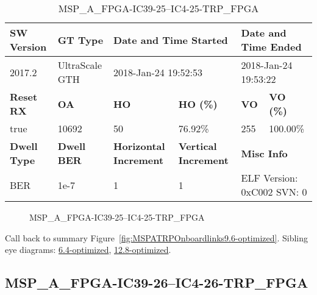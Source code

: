 \begin{table}[h]
\centering
\caption{MSP\_A\_FPGA-IC39-25--IC4-25-TRP\_FPGA}
\label{tab:MSPAFPGAIC3925IC425TRPFPGA9.6-optimized}
\begin{tabular}{@{}|l|l|l|l|l|l|@{}}
\toprule
\textbf{SW Version}                & \textbf{GT Type}   & \multicolumn{2}{l|}{\textbf{Date and Time Started}}            & \multicolumn{2}{l|}{\textbf{Date and Time Ended}}        \\ \midrule
2017.2                       & UltraScale GTH          & \multicolumn{2}{l|}{2018-Jan-24 19:52:53}                   & \multicolumn{2}{l|}{2018-Jan-24 19:53:22}               \\ \midrule
\textbf{Reset RX}                  & \textbf{OA} & \textbf{HO}   & \textbf{HO (\%)} & \textbf{VO} & \textbf{VO (\%)} \\ \midrule
true & 10692        & 50          & 76.92\%        & 255        & 100.00\%       \\ \midrule
\textbf{Dwell Type}                & \textbf{Dwell BER} & \textbf{Horizontal Increment} & \textbf{Vertical Increment}    & \multicolumn{2}{l|}{\textbf{Misc Info}}                  \\ \midrule
BER                            & 1e-7        & 1        & 1           & \multicolumn{2}{l|}{ELF Version: 0xC002 SVN: 0}                         \\ \bottomrule
\end{tabular}
\end{table}

\begin{figure}[h]
\caption{MSP\_A\_FPGA-IC39-25--IC4-25-TRP\_FPGA} \label{fig:MSPAFPGAIC3925IC425TRPFPGA9.6-optimized}
\end{figure}

Call back to summary Figure~\ref{fig:MSPATRPOnboardlinks9.6-optimized}.
Sibling eye diagrams: \hyperref[sec:MSPAFPGAIC3925IC425TRPFPGA6.4-optimized]{6.4-optimized}, \hyperref[sec:MSPAFPGAIC3925IC425TRPFPGA12.8-optimized]{12.8-optimized}.

\clearpage
\newpage


\subsection{MSP\_A\_FPGA-IC39-26--IC4-26-TRP\_FPGA}\label{sec:MSPAFPGAIC3926IC426TRPFPGA9.6-optimized}

